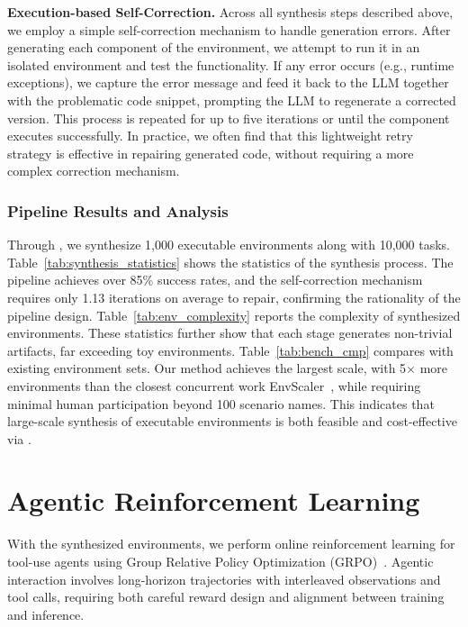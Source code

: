 \documentclass{article}
\theoremstyle{plain}
\theoremstyle{definition}
\theoremstyle{remark}
\newcommand{\synth}{\textls{\textsc{AWM}}\xspace}
\newcommand{\myparagraph}[1]{\noindent\textbf{#1}}
\begin{document}
\myparagraph{Execution-based Self-Correction.}
Across all synthesis steps described above, we employ a simple self-correction mechanism to handle generation errors.
After generating each component of the environment, we attempt to run it in an isolated environment and test the functionality.
If any error occurs (e.g., runtime exceptions), we capture the error message and feed it back to the LLM together with the problematic code snippet, prompting the LLM to regenerate a corrected version.
This process is repeated for up to five iterations or until the component executes successfully. In practice, we often find that this lightweight retry strategy is effective in repairing generated code, without requiring a more complex correction mechanism.

\subsubsection{Pipeline Results and Analysis}
Through \synth, we synthesize 1,000 executable environments along with 10,000 tasks.
Table~\ref{tab:synthesis_statistics} shows the statistics of the synthesis process.
The pipeline achieves over 85\% success rates, and the self-correction mechanism requires only 1.13 iterations on average to repair, confirming the rationality of the pipeline design.
Table~\ref{tab:env_complexity} reports the complexity of synthesized environments.
These statistics further show that each stage generates non-trivial artifacts, far exceeding toy environments.
Table~\ref{tab:bench_cmp} compares \synth with existing environment sets.
Our method achieves the largest scale, with 5$\times$ more environments than the closest concurrent work EnvScaler~\citep{envscaler}, while requiring minimal human participation beyond 100 scenario names.
This indicates that large-scale synthesis of executable environments is both feasible and cost-effective via \synth.







\section{Agentic Reinforcement Learning}
With the synthesized environments, we perform online reinforcement learning for tool-use agents using Group Relative Policy Optimization (GRPO)~\citep{shao2024deepseekmath}. Agentic interaction involves long-horizon trajectories with interleaved observations and tool calls, requiring both careful reward design and alignment between training and inference.
\end{document}
